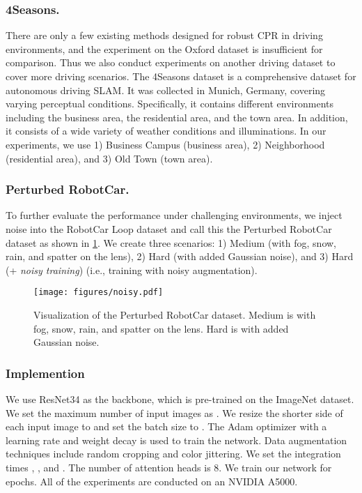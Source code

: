 \documentclass[letterpaper]{article} \usepackage{aaai23}  \usepackage{times}  \usepackage{helvet}  \usepackage{courier}  \usepackage[hyphens]{url}  \usepackage{graphicx} \urlstyle{rm} \def\UrlFont{\rm}  \usepackage{natbib}  \usepackage{caption} \frenchspacing  \setlength{\pdfpagewidth}{8.5in} \setlength{\pdfpageheight}{11in} \usepackage{booktabs}
\theoremstyle{remark}
\theoremstyle{plain}
\begin{document}
\subsubsection{4Seasons.}
There are only a few existing methods designed for robust CPR in driving environments, and the experiment on the Oxford dataset is insufficient for comparison. Thus we also conduct experiments on another driving dataset to cover more driving scenarios. The 4Seasons dataset \cite{4seasons} is a comprehensive dataset for autonomous driving SLAM. It was collected in Munich, Germany, covering varying perceptual conditions. Specifically, it contains different environments including the business area, the residential area, and the town area. In addition, it consists of a wide variety of weather conditions and illuminations. In our experiments, we use 1) Business Campus (business area), 2) Neighborhood (residential area), and 3) Old Town (town area).

\subsubsection{Perturbed RobotCar.}
To further evaluate the performance under challenging environments, we inject noise into the RobotCar Loop dataset and call this the Perturbed RobotCar dataset as shown in \cref{fig:noisy}. We create three scenarios: 1) Medium (with fog, snow, rain, and spatter on the lens), 2) Hard (with added Gaussian noise), and 3) Hard (+ \emph{noisy training}) (i.e., training with noisy augmentation).



\begin{figure}[!t]
\begin{center}
\texttt{[image: figures/noisy.pdf]}
\end{center}
\caption{Visualization of the Perturbed RobotCar dataset. Medium is with fog, snow, rain, and spatter on the lens. Hard is with added Gaussian noise.}
\label{fig:noisy}
\end{figure}


\subsubsection{Implemention}
We use ResNet34 as the backbone, which is pre-trained on the ImageNet dataset. We set the maximum number of input images as . We resize the shorter side of each input image to  and set the batch size to . The Adam optimizer with a learning rate  and weight decay  is used to train the network. Data augmentation techniques include random cropping and color jittering. We set the integration times , , and . The number of attention heads is 8. We train our network for  epochs. All of the experiments are conducted on an NVIDIA A5000. 
\end{document}
